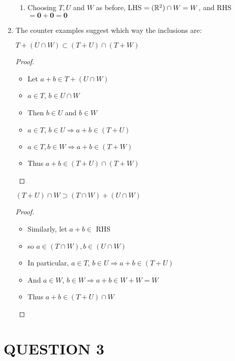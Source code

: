 \documentclass[a4paper]{article}
\begin{document}
\begin{enumerate}
\begin{enumerate}[label = (\alph*)]
		\item Choosing $ T, U $ and $ W $ as before,
		LHS $ = (\mathbb{R}^{2}) \cap W = W $, and RHS $ = \mathbf{0} + \mathbf{0} = \mathbf{0} $
		
	\end{enumerate}

	\item The counter examples suggest which way the inclusions are:
	
	\begin{prop} 
		$ T + (U \cap W) \subset (T + U) \cap ( T + W ) $
	\end{prop} 

\begin{proof}
	\begin{itemize}
		\item Let $ a + b \in T + (U \cap W) $
		\item $ a \in T $, $ b \in U \cap W $
		\item Then $ b \in U $ and $ b \in W $
		\item $ a \in T $, $ b \in U  \Rightarrow a + b \in (T + U) $
		\item $ a \in T, b \in W \Rightarrow a + b \in (T + W) $
		\item Thus $ a + b \in (T + U) \cap (T + W) $
		\end{itemize}
\end{proof}

\begin{prop} 
	$ (T + U) \cap W \supset (T \cap W) + (U \cap W) $
\end{prop}

\begin{proof}
	\begin{itemize}
		\item Similarly, let $ a + b \in $ RHS
		\item so $ a \in (T \cap W), b \in (U \cap W) $
		\item In particular, $ a \in T $, $ b \in U  \Rightarrow a + b \in (T + U)$
		\item And $ a \in W $, $ b \in W \Rightarrow a + b \in W + W = W $
		\item Thus $ a + b \in (T + U) \cap W $
	\end{itemize}
\end{proof}
		
	\end{enumerate}
	
	\section{QUESTION 3}
	
\end{document}
